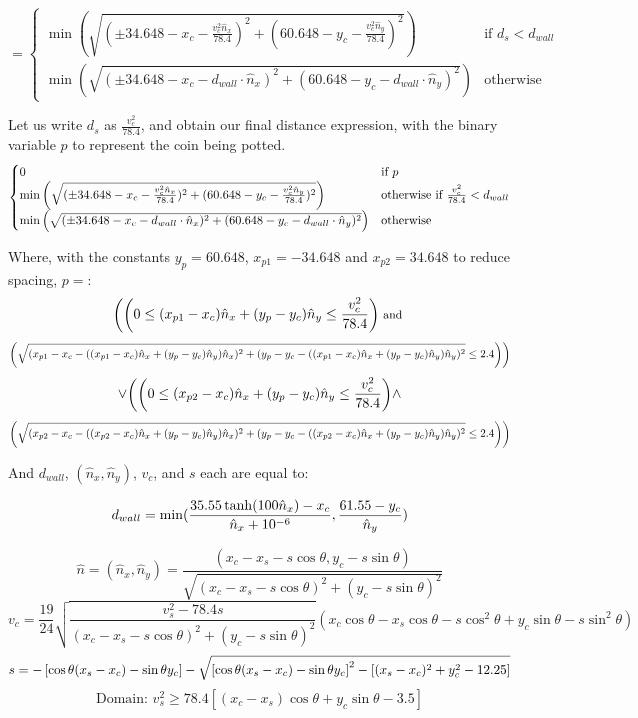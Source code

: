 \documentclass[10pt]{article}
\begin{document}
\[
=
\begin{cases}
\min\left(
\sqrt{(\pm34.648 - x_c - \frac{v_c^2 \hat{n}_x}{78.4})^2 + (60.648 - y_c - \frac{v_c^2 \hat{n}_y}{78.4})^2}
\right) & \text{if } d_s < d_{wall} \\
\min\left(\sqrt{(\pm34.648 - x_c - d_{wall} \cdot \hat{n}_x)^2 + (60.648 - y_c - d_{wall}\cdot\hat{n}_y)^2}\right) & \text{otherwise}
\end{cases}
\]

Let us write $d_s$ as $\frac{v_c^2}{78.4}$, and obtain our final distance expression, with the binary variable $p$ to represent the coin being potted. 
\[
\normalsize
\begin{cases}
0 & \text{if } 
p\\
    \min\left(
    \sqrt{(\pm34.648 - x_c - \frac{v_c^2 \hat{n}_x}{78.4})^2 + (60.648 - y_c - \frac{v_c^2 \hat{n}_y}{78.4})^2}
    \right) & \text{otherwise if } \frac{v_c^2}{78.4} < d_{wall} \\
\min\left(\sqrt{(\pm34.648 - x_c - d_{wall} \cdot \hat{n}_x)^2 + (60.648 - y_c - d_{wall}\cdot\hat{n}_y)^2}\right) & \text{otherwise}
\end{cases}
\]

Where, with the constants $y_p = 60.648$, $x_{p1} = -34.648$ and $x_{p2} = 34.648$ to reduce spacing, $p =$:
\[
\footnotesize
\Bigg( \Bigg(
0 \leq (x_{p1} - x_c)\hat{n}_x + (y_{p} - y_c)\hat{n}_y \leq \frac{v_c^2}{78.4} \Bigg)\text{ and }
\]
\[
\footnotesize
\Bigg(\\\sqrt{(x_{p1} - x_c - ((x_{p1} - x_c)\hat{n}_x + (y_{p} - y_c)\hat{n}_y) \hat{n}_x)^2 + (y_{p} - y_c - ((x_{p1} - x_c)\hat{n}_x + (y_{p} - y_c)\hat{n}_y) \hat{n}_y)^2}  \leq 2.4 \Bigg) \Bigg)
\]
\[
\footnotesize
 \lor \Bigg( \Bigg(
0 \leq (x_{p2} - x_c)\hat{n}_x + (y_{p} - y_c)\hat{n}_y \leq \frac{v_c^2}{78.4} \Bigg) \land
\]
\[
\footnotesize
\Bigg( \sqrt{(x_{p2} - x_c - ((x_{p2} - x_c)\hat{n}_x + (y_{p} - y_c)\hat{n}_y) \hat{n}_x)^2 + (y_{p} - y_c - ((x_{p2} - x_c)\hat{n}_x + (y_{p} - y_c)\hat{n}_y) \hat{n}_y)^2}  \leq 2.4 \Bigg) \Bigg)
\]


And $d_{wall}$, $(\hat{n}_x,\hat{n}_y)$, $v_c$, and $s$ each are equal to:

\[
\small
d_{wall} = \min(\frac{35.55 \tanh(100\hat{n}_x) - x_c}{\hat{n}_x + 10^{-6}},\frac{61.55 - y_c}{\hat{n}_y})
\]

\[
\hat{n} = (\hat{n}_x,\hat{n}_y) = \frac{(x_c - x_s - s \cos \theta, y_c - s\sin\theta)}{\sqrt{(x_c - x_s - s \cos \theta)^2 + (y_c - s\sin\theta)^2}}
\]
\[
v_c = \frac{19}{24} \sqrt{\frac{v_s^2 - 78.4s}{(x_c - x_s - s \cos \theta)^2 + (y_c - s\sin\theta)^2}} \left(x_c\cos\theta - x_s\cos\theta - s \cos^2 \theta + y_c\sin\theta - s\sin^2\theta\right)
\]
\[
\small
s = -\left[\cos \theta (x_s - x_c) - \sin \theta y_c\right] 
- 
\sqrt{
\left[\cos \theta (x_s - x_c) - \sin \theta y_c\right]^2 
- 
\left[(x_s - x_c)^2 + y_c^2 - 12.25\right]
}
\]
\[
\text{Domain: } v_s^2 \geq 78.4[(x_c-x_s)\cos\theta+y_c\sin\theta - 3.5]
\]
\end{document}
